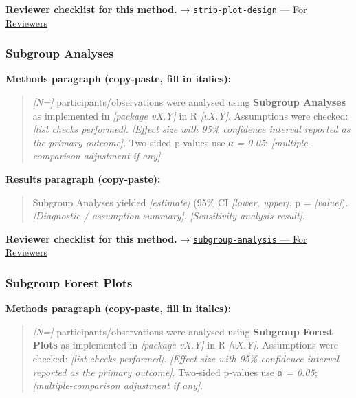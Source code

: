 \documentclass[
]{article}
\begin{document}
\textbf{Reviewer checklist for this method.} →
\href{../chapters/16-design/strip-plot-design.Rmd\#for-reviewers}{\texttt{strip-plot-design}
--- For Reviewers}

\subsubsection{Subgroup Analyses}\label{subgroup-analyses}

\textbf{Methods paragraph (copy-paste, fill in italics):}

\begin{quote}
\emph{{[}N={]}} participants/observations were analysed using
\textbf{Subgroup Analyses} as implemented in \emph{{[}package vX.Y{]}}
in R \emph{{[}vX.Y{]}}. Assumptions were checked: \emph{{[}list checks
performed{]}}. \emph{{[}Effect size with 95\% confidence interval
reported as the primary outcome{]}}. Two-sided p-values use \emph{α =
0.05}; \emph{{[}multiple-comparison adjustment if any{]}}.
\end{quote}

\textbf{Results paragraph (copy-paste):}

\begin{quote}
Subgroup Analyses yielded \emph{{[}estimate{]}} (95\% CI \emph{{[}lower,
upper{]}}, p = \emph{{[}value{]}}). \emph{{[}Diagnostic / assumption
summary{]}}. \emph{{[}Sensitivity analysis result{]}}.
\end{quote}

\textbf{Reviewer checklist for this method.} →
\href{../chapters/14-clinical/subgroup-analysis.Rmd\#for-reviewers}{\texttt{subgroup-analysis}
--- For Reviewers}

\subsubsection{Subgroup Forest Plots}\label{subgroup-forest-plots}

\textbf{Methods paragraph (copy-paste, fill in italics):}

\begin{quote}
\emph{{[}N={]}} participants/observations were analysed using
\textbf{Subgroup Forest Plots} as implemented in \emph{{[}package
vX.Y{]}} in R \emph{{[}vX.Y{]}}. Assumptions were checked: \emph{{[}list
checks performed{]}}. \emph{{[}Effect size with 95\% confidence interval
reported as the primary outcome{]}}. Two-sided p-values use \emph{α =
0.05}; \emph{{[}multiple-comparison adjustment if any{]}}.
\end{quote}
\end{document}
